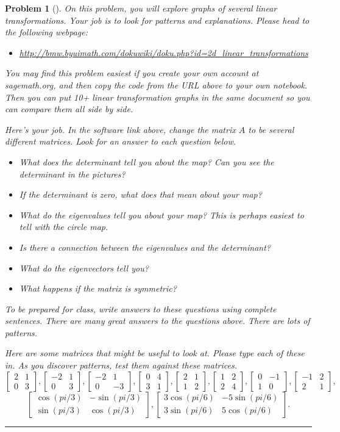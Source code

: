 \documentclass[letterpaper,oneside]{book}%
\newcommand{\urllineartransformationsinplane}{http://bmw.byuimath.com/dokuwiki/doku.php?id=2d\_linear\_transformations}
\theoremstyle{plain}
\theoremstyle{box}
\theoremstyle{problem}
\newtheorem{problemnum}{Problem}[chapter]
\newenvironment{problem}[1][]{\begin{problemnum}[#1]}{\end{problemnum}\nopagebreak\hrule\bigskip}
\newcommand{\bvec}[1]{\begin{bmatrix} #1 \end{bmatrix}}
\begin{document}
\begin{problem}
 On this problem, you will explore graphs of several linear transformations. Your job is to look for patterns and explanations.  Please head to the following webpage:
\begin{itemize}
 \item \href{\urllineartransformationsinplane}{\urllineartransformationsinplane}
\end{itemize}
You may find this problem easiest if you create your own account at sagemath.org, and then copy the code from the URL above to your own notebook. Then you can put 10+ linear transformation graphs in the same document so you can compare them all side by side. 

Here's your job. In the software link above, change the matrix $A$ to be several different matrices. Look for an answer to each question below.
\begin{itemize}
 \item What does the determinant tell you about the map? Can you see the determinant in the pictures?
 \item If the determinant is zero, what does that mean about your map?
 \item What do the eigenvalues tell you about your map? This is perhaps easiest to tell with the circle map.
 \item Is there a connection between the eigenvalues and the determinant?
 \item What do the eigenvectors tell you?
 \item What happens if the matrix is symmetric?
\end{itemize}
To be prepared for class, write answers to these questions using complete sentences.
There are many great answers to the questions above. There are lots of patterns. 

Here are some matrices that might be useful to look at. Please type each of these in.  As you discover patterns, test them against these matrices. 
$$
\bvec{2&1\\0&3},
\bvec{-2&1\\0&3},
\bvec{-2&1\\0&-3},
\bvec{0&4\\3&1},
\bvec{2&1\\1&2},
\bvec{1&2\\2&4},
\bvec{0&-1\\1&0},
\bvec{-1&2\\2&1},
$$
$$\bvec{\cos(pi/3)&-\sin(pi/3)\\ \sin(pi/3)&\cos(pi/3)},
\bvec{3\cos(pi/6)&-5\sin(pi/6)\\ 3\sin(pi/6)&5\cos(pi/6)}.
$$
\end{problem}
\end{document}
